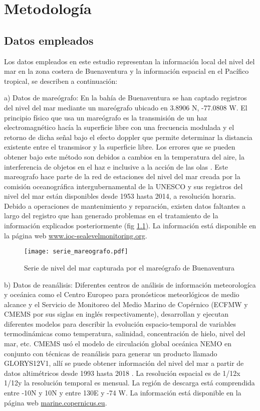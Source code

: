 \chapter{Metodología}

\section{Datos empleados}

Los datos empleados en este estudio representan la información local del nivel del mar en la zona costera de Buenaventura y la información espacial en el Pacífico tropical, se describen a continuación:

a) Datos de mareógrafo: En la bahía de Buenaventura  se han captado registros del nivel del mar mediante un mareógrafo ubicado en 3.8906 \textdegree N, -77.0808 \textdegree W. El principio físico que usa un mareógrafo es la transmisión de un haz electromagnético hacía la superficie libre con una frecuencia modulada y el retorno de dicha señal bajo el efecto doppler que permite determinar la distancia existente entre el transmisor y la superficie libre. Los errores que se pueden obtener bajo este método son debidos a cambios en la temperatura del aire, la interferencia de objetos en el haz e inclusive a la acción de las olas \citep{UNESCO2016}. Este mareografo hace parte de la red de estaciones del nivel del mar creada por la comisión oceanográfica intergubernamental de la UNESCO y sus registros del nivel del mar están disponibles desde 1953 hasta 2014, a resolución horaria. Debido a operaciones de mantenimiento y reparación, existen datos faltantes a largo del registro que han generado problemas en el tratamiento de la información explicados posteriormente (fig \ref{fig:serie_real}). La información está disponible en la página web \url{www.ioc-sealevelmonitoring.org}.

\begin{figure}[H]
	\centering
	\texttt{[image: serie\_mareografo.pdf]}
	\caption{Serie de nivel del mar capturada por el mareógrafo de Buenaventura}
	\label{fig:serie_real}
\end{figure}

b) Datos de reanálisis: Diferentes centros de análisis de información meteorologíca y oceánica como el Centro Europeo para pronósticos meteorlógicos de medio alcance y el Servicio de Monitoreo del Medio Marino de Copérnico (ECFMW y CMEMS por sus siglas en inglés respectivamente), desarrollan y ejecutan diferentes modelos para describir la evolución espacio-temporal de variables termodinámicas como temperatura, salinidad, concentración de hielo, nivel del mar, etc. CMEMS usó el modelo de circulación global oceánica NEMO en conjunto con técnicas de reanálisis para generar un producto llamado GLORYS12V1, allí se puede obtener información del nivel del mar a partir de datos altimétricos desde 1993 hasta 2018 \citep{Fernandez2018}. La resolución espacial es de 1/12\textdegree x 1/12\textdegree y la resolución temporal es mensual. La región de descarga está comprendida entre -10\textdegree N y 10\textdegree N y entre 130\textdegree E y -74\textdegree
W. La información está disponible en la página web \url{marine.copernicus.eu}.

